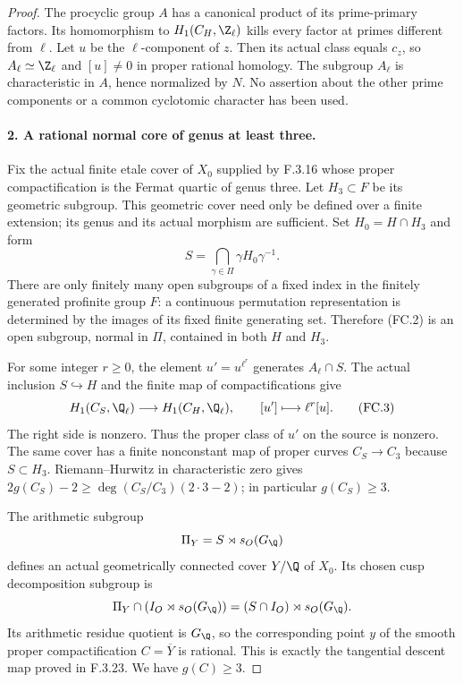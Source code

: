 \begin{proof}
The procyclic group $A$ has a canonical product of
its prime-primary factors. Its homomorphism to
$H_1(C_H,\Z_\ell)$ kills every factor at primes
different from $\ell$. Let $u$ be the $\ell$-component
of $z$. Then its actual class equals $c_z$, so
$A_\ell\simeq\Z_\ell$ and $[u]\ne0$ in proper
rational homology. The subgroup $A_\ell$ is
characteristic in $A$, hence normalized by $N$.
No assertion about the other prime components
or a common cyclotomic character has been used.

\paragraph{2. A rational normal core of genus at least three.}
Fix the actual finite etale cover of $X_0$ supplied
by F.3.16 whose proper compactification is the
Fermat quartic of genus three. Let $H_3\subset F$
be its geometric subgroup. This geometric cover
need only be defined over a finite extension;
its genus and its actual morphism are sufficient.
Set $H_0=H\cap H_3$ and form
\[
                  S=\bigcap_{\gamma\in\Pi}
                          \gamma H_0\gamma^{-1}.           \tag{FC.2}
\]
There are only finitely many open subgroups of a
fixed index in the finitely generated profinite
group $F$: a continuous permutation representation
is determined by the images of its fixed finite
generating set. Therefore (FC.2) is an open
subgroup, normal in $\Pi$, contained in both
$H$ and $H_3$.

For some integer $r\geq0$, the element
$u'=u^{\ell^r}$ generates $A_\ell\cap S$.
The actual inclusion $S\hookrightarrow H$ and
the finite map of compactifications give
\[
 H_1(C_S,\Q_\ell)\longrightarrow H_1(C_H,\Q_\ell),
                    \qquad [u']\longmapsto\ell^r[u].       \tag{FC.3}
\]
The right side is nonzero. Thus the proper class
of $u'$ on the source is nonzero. The same cover
has a finite nonconstant map of proper curves
$C_S\to C_3$ because $S\subset H_3$.
Riemann--Hurwitz in characteristic zero gives
$2g(C_S)-2\geq\deg(C_S/C_3)(2\cdot3-2)$;
in particular $g(C_S)\geq3$.

The arithmetic subgroup
\[
                     \Pi_Y=S\rtimes s_O(G_\Q)
\]
defines an actual geometrically connected cover
$Y/\Q$ of $X_0$. Its chosen cusp decomposition
subgroup is
\[
 \Pi_Y\cap(I_O\rtimes s_O(G_\Q))
                  =(S\cap I_O)\rtimes s_O(G_\Q).
\]
Its arithmetic residue quotient is $G_\Q$, so
the corresponding point $y$ of the smooth proper
compactification $C=\overline Y$ is rational.
This is exactly the tangential descent map
proved in F.3.23. We have $g(C)\geq3$.


\end{proof}
